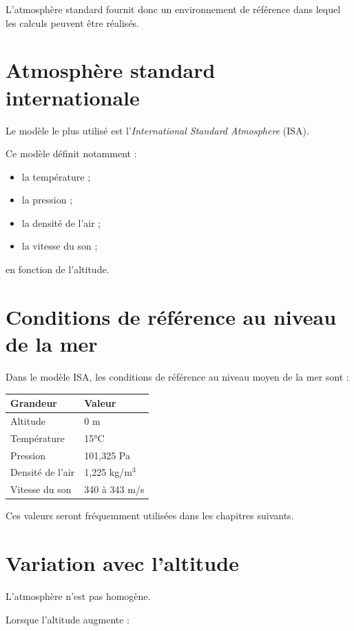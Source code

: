 L'atmosphère standard fournit donc un environnement de référence dans lequel
les calculs peuvent être réalisés.

\section{Atmosphère standard internationale}

Le modèle le plus utilisé est l'\emph{International Standard Atmosphere}
(ISA).

Ce modèle définit notamment :

\begin{itemize}
\item la température ;
\item la pression ;
\item la densité de l'air ;
\item la vitesse du son ;
\end{itemize}

en fonction de l'altitude.

\section{Conditions de référence au niveau de la mer}

Dans le modèle ISA, les conditions de référence au niveau moyen de la mer sont :

\begin{center}
\begin{tabular}{ll}
\toprule
Grandeur & Valeur \\
\midrule
Altitude & 0 m \\
Température & 15°C \\
Pression & 101,325 Pa \\
Densité de l'air & 1,225 kg/m$^3$ \\
Vitesse du son & 340 à 343 m/s \\
\bottomrule
\end{tabular}
\end{center}

Ces valeurs seront fréquemment utilisées dans les chapitres suivants.

\section{Variation avec l'altitude}

L'atmosphère n'est pas homogène.

Lorsque l'altitude augmente :

